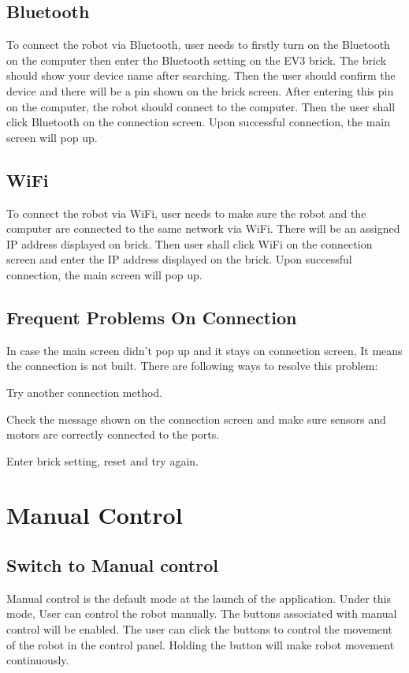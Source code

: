 \documentclass[12pt,a4paper]{article}
\renewenvironment{enumerate}[1]{\begin{compactenum}#1}{\end{compactenum}}
\begin{document}
\subsection{Bluetooth} 
To connect the robot via Bluetooth, user needs to firstly turn on the Bluetooth on the computer then enter the Bluetooth setting on the EV3 brick. The brick should show your device name after searching. Then the user should confirm the device and there will be a pin shown on the brick screen. After entering this pin on the computer, the robot should connect to the computer. Then the user shall click Bluetooth on the connection screen. Upon successful connection, the main screen will pop up.
\subsection{WiFi} 
To connect the robot via WiFi, user needs to make sure the robot and the computer are connected to the same network via WiFi. There will be an assigned IP address displayed on brick. Then user shall click WiFi on the connection screen and enter the IP address displayed on the brick. Upon successful connection, the main screen will pop up.

\subsection{Frequent Problems On Connection} 
In case the main screen didn't pop up and it stays on connection screen, It means the connection is not built. There are following ways to resolve this problem:
\begin{enumerate}
\item Try another connection method.
\item Check the message shown on the connection screen and make sure sensors and motors are correctly connected to the ports.
\item Enter brick setting, reset and try again.
\end{enumerate}
\newpage


\section{Manual Control}
\subsection{Switch to Manual control} 
Manual control is the default mode at the launch of the application. Under this mode, User can control the robot manually. The buttons associated with manual control will be enabled. The user can click the buttons to control the movement of the robot in the control panel. Holding the button will make robot movement continuously.
\end{document}
